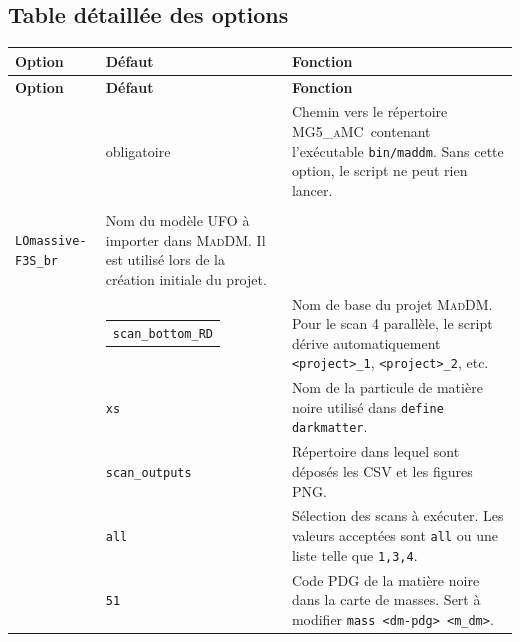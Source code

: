 \documentclass[11pt,a4paper]{article}
\newcommand{\opt}[1]{\texttt{\detokenize{#1}}}
\newcommand{\file}[1]{\texttt{#1}}
\newcommand{\mad}{\textsc{MadDM}}
\newcommand{\mg}{\textsc{MG5\_aMC}}
\begin{document}
\subsection{Table détaillée des options}

\renewcommand{\arraystretch}{1.18}
{\small
\begin{longtable}{>{\raggedright\arraybackslash}p{} >{\raggedright\arraybackslash}p{} >{\raggedright\arraybackslash}p{}}
\toprule
\textbf{Option} & \textbf{Défaut} & \textbf{Fonction} \\
\midrule
\endfirsthead
\toprule
\textbf{Option} & \textbf{Défaut} & \textbf{Fonction} \\
\midrule
\endhead
\bottomrule
\endfoot

\opt{--mg5} & obligatoire & Chemin vers le répertoire \mg\ contenant l'exécutable \file{bin/maddm}. Sans cette option, le script ne peut rien lancer. \\

\opt{--model} & \begin{tabular}[t]{@{}l@{}}\texttt{DMSimpt\_v2\_0\_}\\\texttt{LOmassive-F3S\_br}\end{tabular} & Nom du modèle UFO à importer dans \mad. Il est utilisé lors de la création initiale du projet. \\

\opt{--project} & \begin{tabular}[t]{@{}l@{}}\texttt{scan\_bottom\_}\texttt{RD}\end{tabular} & Nom de base du projet \mad. Pour le scan 4 parallèle, le script dérive automatiquement \texttt{<project>\_1}, \texttt{<project>\_2}, etc. \\

\opt{--dmname} & \texttt{xs} & Nom de la particule de matière noire utilisé dans \texttt{define darkmatter}. \\

\opt{--outdir} & \texttt{scan\_outputs} & Répertoire dans lequel sont déposés les CSV et les figures PNG. \\

\opt{--scans} & \texttt{all} & Sélection des scans à exécuter. Les valeurs acceptées sont \texttt{all} ou une liste telle que \texttt{1,3,4}. \\

\opt{--dm-pdg} & \texttt{51} & Code PDG de la matière noire dans la carte de masses. Sert à modifier \texttt{mass <dm-pdg> <m\_dm>}. \\


\end{longtable}}
\end{document}

